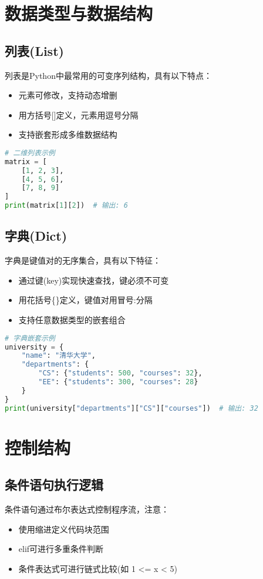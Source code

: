\documentclass{ctexart}
\begin{document}
\section{数据类型与数据结构}
\subsection{列表(List)}
列表是Python中最常用的可变序列结构，具有以下特点：
\begin{itemize}
\item 元素可修改，支持动态增删
\item 用方括号[]定义，元素用逗号分隔
\item 支持嵌套形成多维数据结构
\end{itemize}

\begin{lstlisting}[language=Python]
# 二维列表示例
matrix = [
    [1, 2, 3],
    [4, 5, 6],
    [7, 8, 9]
]
print(matrix[1][2])  # 输出: 6
\end{lstlisting}

\subsection{字典(Dict)}
字典是键值对的无序集合，具有以下特征：
\begin{itemize}
\item 通过键(key)实现快速查找，键必须不可变
\item 用花括号\{\}定义，键值对用冒号:分隔
\item 支持任意数据类型的嵌套组合
\end{itemize}

\begin{lstlisting}[language=Python]
# 字典嵌套示例
university = {
    "name": "清华大学",
    "departments": {
        "CS": {"students": 500, "courses": 32},
        "EE": {"students": 300, "courses": 28}
    }
}
print(university["departments"]["CS"]["courses"])  # 输出: 32
\end{lstlisting}

\section{控制结构}
\subsection{条件语句执行逻辑}
条件语句通过布尔表达式控制程序流，注意：
\begin{itemize}
\item 使用缩进定义代码块范围
\item elif可进行多重条件判断
\item 条件表达式可进行链式比较(如 1 <= x < 5)
\end{itemize}
\end{document}
